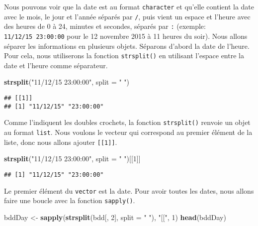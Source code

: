 \documentclass[]{book}
\newenvironment{Shaded}{\begin{snugshade}}{\end{snugshade}}
\newcommand{\KeywordTok}[1]{\textcolor[rgb]{0.13,0.29,0.53}{\textbf{#1}}}
\newcommand{\DataTypeTok}[1]{\textcolor[rgb]{0.13,0.29,0.53}{#1}}
\newcommand{\DecValTok}[1]{\textcolor[rgb]{0.00,0.00,0.81}{#1}}
\newcommand{\StringTok}[1]{\textcolor[rgb]{0.31,0.60,0.02}{#1}}
\newcommand{\NormalTok}[1]{#1}
\theoremstyle{definition}
\theoremstyle{definition}
\theoremstyle{definition}
\theoremstyle{remark}
\begin{document}
Nous pouvons voir que la date est au format \texttt{character} et
qu'elle contient la date avec le mois, le jour et l'année séparés par
\texttt{/}, puis vient un espace et l'heure avec des heures de 0 à 24,
minutes et secondes, séparés par \texttt{:} (exemple:
\texttt{11/12/15\ 23:00:00} pour le 12 novembre 2015 à 11 heures du
soir). Nous allons séparer les informations en plusieurs objets.
Séparons d'abord la date de l'heure. Pour cela, nous utiliserons la
fonction \texttt{strsplit()} en utilisant l'espace entre la date et
l'heure comme séparateur.

\begin{Shaded}
\begin{Highlighting}[]
\KeywordTok{strsplit}\NormalTok{(}\StringTok{"11/12/15 23:00:00"}\NormalTok{, }\DataTypeTok{split =} \StringTok{" "}\NormalTok{)}
\end{Highlighting}
\end{Shaded}

\begin{verbatim}
## [[1]]
## [1] "11/12/15" "23:00:00"
\end{verbatim}

Comme l'indiquent les doubles crochets, la fonction \texttt{strsplit()}
renvoie un objet au format \texttt{list}. Nous voulons le vecteur qui
correspond au premier élément de la liste, donc nous allons ajouter
\texttt{{[}{[}1{]}{]}}.

\begin{Shaded}
\begin{Highlighting}[]
\KeywordTok{strsplit}\NormalTok{(}\StringTok{"11/12/15 23:00:00"}\NormalTok{, }\DataTypeTok{split =} \StringTok{" "}\NormalTok{)[[}\DecValTok{1}\NormalTok{]]}
\end{Highlighting}
\end{Shaded}

\begin{verbatim}
## [1] "11/12/15" "23:00:00"
\end{verbatim}

Le premier élément du \texttt{vector} est la date. Pour avoir toutes les
dates, nous allons faire une boucle avec la fonction \texttt{sapply()}.

\begin{Shaded}
\begin{Highlighting}[]
\NormalTok{bddDay <-}\StringTok{ }\KeywordTok{sapply}\NormalTok{(}\KeywordTok{strsplit}\NormalTok{(bdd[, }\DecValTok{2}\NormalTok{], }\DataTypeTok{split =} \StringTok{" "}\NormalTok{), }\StringTok{"[["}\NormalTok{, }\DecValTok{1}\NormalTok{)}
\KeywordTok{head}\NormalTok{(bddDay)}
\end{Highlighting}
\end{Shaded}
\end{document}
